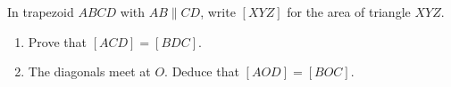 In trapezoid $ABCD$ with $AB\parallel CD$, write $[XYZ]$ for the area of triangle $XYZ$.
\begin{enumerate}
\item[(a)] Prove that $[ACD]=[BDC]$.
\item[(b)] The diagonals meet at $O$. Deduce that $[AOD]=[BOC]$.
\end{enumerate}
